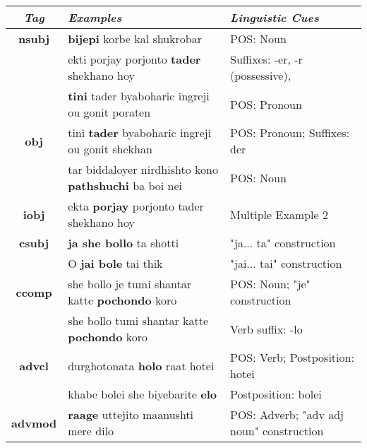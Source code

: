 \documentclass[a4 paper]{article}
\begin{document}
\begin{longtable}{cp{}p{}}
    \toprule
    \textit{Tag} & \textit{Examples} & \textit{Linguistic Cues} \\ 
    \toprule
    \addlinespace[0.5em]
    \textbf{nsubj}
                 & \textbf{bijepi} korbe kal shukrobar
                 & POS: Noun\\
    \addlinespace[0.5em]
                 & ekti porjay porjonto \textbf{tader} shekhano hoy
                 & Suffixes: -er, -r (possessive), \\
    \addlinespace[0.5em]
                 & \textbf{tini} tader byaboharic ingreji ou gonit poraten
                 & POS: Pronoun\\
    \midrule
    \addlinespace[0.5em]
    \textbf{obj}
                 & tini \textbf{tader} byaboharic ingreji ou gonit shekhan
                 & POS: Pronoun; Suffixes: der\\
    \addlinespace[0.5em]
                 & tar biddaloyer nirdhishto kono \textbf{pathshuchi} ba boi nei
                 & POS: Noun \\
    \midrule
    \addlinespace[0.5em]
    \textbf{iobj}
                 & ekta \textbf{porjay} porjonto tader shekhano hoy
                 & Multiple Example 2\\
    \midrule
    \addlinespace[0.5em]
    \textbf{csubj}
                 & \textbf{ja she bollo} ta shotti & "ja... ta" construction\\
    \addlinespace[0.5em]
                 & O \textbf{jai bole} tai thik & "jai... tai" construction\\
    \midrule
    \addlinespace[0.5em]
    \textbf{ccomp}
                 & she bollo je tumi shantar katte \textbf{pochondo} koro & POS: Noun; "je" construction\\
    \addlinespace[0.5em]
                 & she bollo tumi shantar katte \textbf{pochondo} koro & Verb suffix: -lo\\
    \midrule
    \addlinespace[0.5em]
    \textbf{advcl}
                 & durghotonata \textbf{holo} raat hotei & POS: Verb; Postposition: hotei\\
    \addlinespace[0.5em]
                 & khabe bolei she biyebarite \textbf{elo} & Postposition: bolei\\
    \midrule
    \textbf{advmod}
                 & \textbf{raage} uttejito maanushti mere dilo & POS: Adverb; "adv adj noun" construction\\
    \midrule

\end{longtable}
\end{document}
